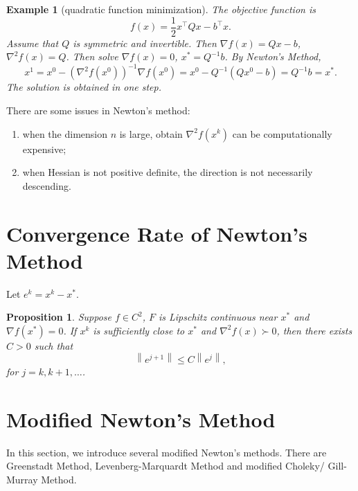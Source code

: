 \documentclass[12pt,a4paper]{report}
\numberwithin{equation}{section}
\theoremstyle{mystyle}
\newtheorem{proposition}[definition]{Proposition}
\newtheorem{example}[definition]{Example}
\newcommand{\grad}{\nabla}
\newcommand{\T}{\top}
\newcommand{\norm}[1]{\left\lVert #1 \right\rVert}
\begin{document}
	\begin{example}[quadratic function minimization]
		The objective function is 
		$$
		f(x)=\frac{1}{2}x^\T Q x-b^\T x.
		$$
		Assume that $Q$ is symmetric and invertible. Then $\grad f(x)=Qx-b$, $\grad^2f(x)=Q$. Then solve $\grad f(x)=0$, $x^*=Q^{-1}b$. By Newton's Method,
		$$
		x^1=x^0-(\grad^2 f(x^0))^{-1}\grad f(x^0)=x^0-Q^{-1}(Qx^0-b)=Q^{-1}b=x^*.
		$$
		The solution is obtained in one step.
	\end{example}
	
	There are some issues in Newton's method:
	\begin{enumerate}
		\item when the dimension $n$ is large, obtain $\grad^2 f(x^k)$ can be computationally expensive;
		\item when Hessian is not positive definite, the direction is not necessarily descending.
	\end{enumerate}
	
	\section{Convergence Rate of Newton's Method}
	Let $e^k=x^k-x^*$.
	\begin{proposition}
		Suppose $f\in C^2$, $F$ is Lipschitz continuous near $x^*$ and $\grad f(x^*)=0$. If $x^k$ is sufficiently close to $x^*$ and $\grad^2 f(x)\succ 0$, then there exists $C>0$ such that
		\begin{equation*}
			\norm{e^{j+1}}\leq C\norm{e^j},
		\end{equation*}
		for $j=k,k+1,\dots$.
	\end{proposition}





	\section{Modified Newton's Method}
	In this section, we introduce several modified Newton's methods. There are Greenstadt Method, Levenberg-Marquardt Method and modified Choleky/ Gill-Murray Method.
	
	
	
\end{document}
